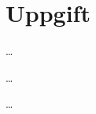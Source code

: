 \section{Uppgift}
\label{sec:Exercises}
\noindent
\dots

\begin{questions}															   
	\question
	\dots
	\begin{solution}
		\dots
	\end{solution}

\end{questions}
